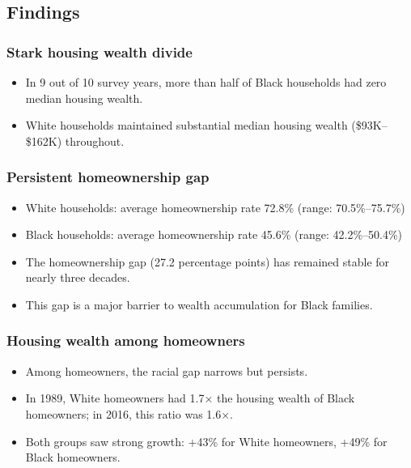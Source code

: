 \documentclass[
  12pt]{article}
\providecommand{\tightlist}{%
  \setlength{\itemsep}{0pt}\setlength{\parskip}{0pt}}\usepackage{longtable,booktabs,array}
\begin{document}
\subsection{Findings}\label{findings}

\subsubsection{Stark housing wealth
divide}\label{stark-housing-wealth-divide}

\begin{itemize}
\tightlist
\item
  In 9 out of 10 survey years, more than half of Black households had
  zero median housing wealth.
\item
  White households maintained substantial median housing wealth
  (\$93K--\$162K) throughout.
\end{itemize}

\subsubsection{Persistent homeownership
gap}\label{persistent-homeownership-gap}

\begin{itemize}
\tightlist
\item
  White households: average homeownership rate 72.8\% (range:
  70.5\%--75.7\%)
\item
  Black households: average homeownership rate 45.6\% (range:
  42.2\%--50.4\%)
\item
  The homeownership gap (27.2 percentage points) has remained stable for
  nearly three decades.
\item
  This gap is a major barrier to wealth accumulation for Black families.
\end{itemize}

\subsubsection{Housing wealth among
homeowners}\label{housing-wealth-among-homeowners}

\begin{itemize}
\tightlist
\item
  Among homeowners, the racial gap narrows but persists.
\item
  In 1989, White homeowners had 1.7× the housing wealth of Black
  homeowners; in 2016, this ratio was 1.6×.
\item
  Both groups saw strong growth: +43\% for White homeowners, +49\% for
  Black homeowners.
\end{itemize}
\end{document}
